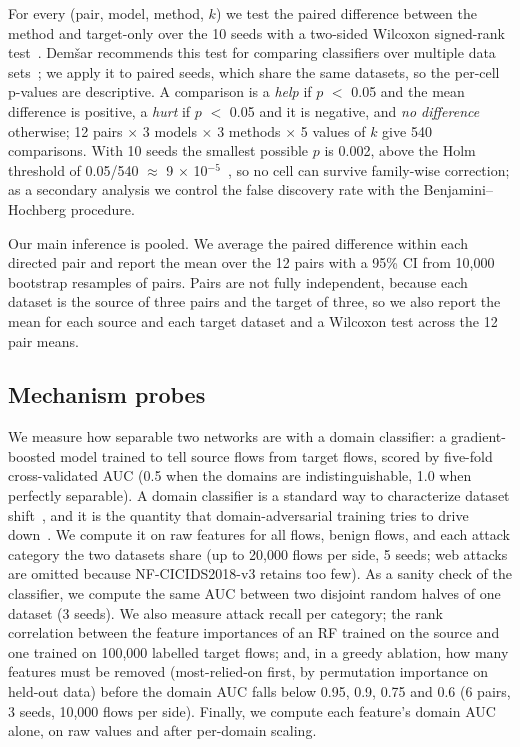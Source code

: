 \documentclass[11pt]{article}
\begin{document}
For every (pair, model, method, $k$) we test the paired difference between the method and target-only over the 10 seeds with a two-sided Wilcoxon signed-rank test~\cite{wilcoxon1945individual}. Demšar recommends this test for comparing classifiers over multiple data sets~\cite{demsar2006statistical}; we apply it to paired seeds, which share the same datasets, so the per-cell p-values are descriptive. A comparison is a \emph{help} if $p$ $<$ 0.05 and the mean difference is positive, a \emph{hurt} if $p$ $<$ 0.05 and it is negative, and \emph{no difference} otherwise; 12 pairs $\times$ 3 models $\times$ 3 methods $\times$ 5 values of $k$ give 540 comparisons. With 10 seeds the smallest possible $p$ is 0.002, above the Holm threshold of 0.05/540 $\approx$ 9 $\times$ 10$^{-5}$~\cite{holm1979simple}, so no cell can survive family-wise correction; as a secondary analysis we control the false discovery rate with the Benjamini--Hochberg procedure.

Our main inference is pooled. We average the paired difference within each directed pair and report the mean over the 12 pairs with a 95\% CI from 10,000 bootstrap resamples of pairs. Pairs are not fully independent, because each dataset is the source of three pairs and the target of three, so we also report the mean for each source and each target dataset and a Wilcoxon test across the 12 pair means.

\subsection{Mechanism probes}

We measure how separable two networks are with a domain classifier: a gradient-boosted model trained to tell source flows from target flows, scored by five-fold cross-validated AUC (0.5 when the domains are indistinguishable, 1.0 when perfectly separable). A domain classifier is a standard way to characterize dataset shift~\cite{rabanser2019failing}, and it is the quantity that domain-adversarial training tries to drive down~\cite{ganin2016domain}. We compute it on raw features for all flows, benign flows, and each attack category the two datasets share (up to 20,000 flows per side, 5 seeds; web attacks are omitted because NF-CICIDS2018-v3 retains too few). As a sanity check of the classifier, we compute the same AUC between two disjoint random halves of one dataset (3 seeds). We also measure attack recall per category; the rank correlation between the feature importances of an RF trained on the source and one trained on 100,000 labelled target flows; and, in a greedy ablation, how many features must be removed (most-relied-on first, by permutation importance on held-out data) before the domain AUC falls below 0.95, 0.9, 0.75 and 0.6 (6 pairs, 3 seeds, 10,000 flows per side). Finally, we compute each feature's domain AUC alone, on raw values and after per-domain scaling.
\end{document}
